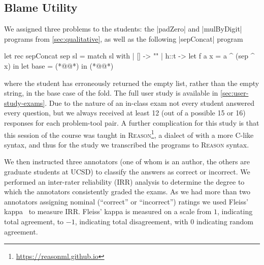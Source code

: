 \subsection{Blame Utility}
\label{sec:user-study}



We assigned three problems to the students: the |padZero| and
|mulByDigit| programs from \autoref{sec:qualitative}, as well as
the following |sepConcat| program
%
\begin{ecode}
  let rec sepConcat sep sl =
    match sl with
    | [] -> ""
    | h::t ->
        let f a x = a ^ (sep ^ x) in
        let base = (*@\hlTree{[]}@*) in
        (*@@*)
\end{ecode}
%
where the student has erroneously returned the empty list, rather than
the empty string, in the base case of the fold.
%
%
The full user study is available in \autoref{sec:user-study-exams}.
%
Due to the nature of an in-class exam not every student answered every
question, but we always received at least 12 (out of a possible 15 or
16) responses for each problem-tool pair.
%
A further complication for this study is that this session of the course
was taught in \textsc{Reason}\footnote{\url{https://reasonml.github.io}},
a dialect of \ocaml with a more C-like syntax, and thus for the study
we transcribed the programs to \textsc{Reason} syntax.

We then instructed three annotators (one of whom is an author, the others
are graduate students at UCSD) to classify the answers as
correct or incorrect.
%
We performed an inter-rater reliability (IRR) analysis to determine the
degree to which the annotators consistently graded the exams.
%
As we had more than two annotators assigning nominal (``correct'' or
``incorrect'') ratings we used Fleiss' kappa~\cite{Fleiss1971-du} to
measure IRR.\@
%
Fleiss' kappa is measured on a scale from $1$, indicating total
agreement, to $-1$, indicating total disagreement, with $0$ indicating
random agreement.

